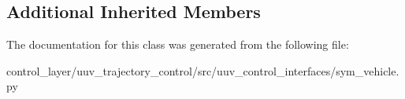 \subsection*{Additional Inherited Members}


The documentation for this class was generated from the following file\+:\begin{DoxyCompactItemize}
\item 
control\+\_\+layer/uuv\+\_\+trajectory\+\_\+control/src/uuv\+\_\+control\+\_\+interfaces/sym\+\_\+vehicle.\+py\end{DoxyCompactItemize}
